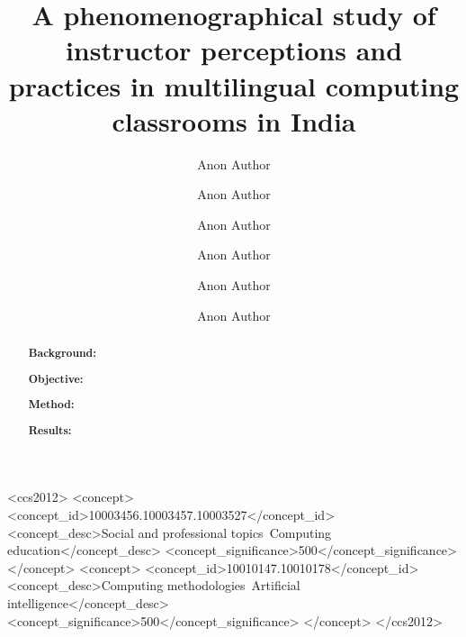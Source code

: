 \documentclass[sigconf]{acmart}
\begin{document}
\title[]{A phenomenographical study of instructor perceptions and practices in multilingual computing classrooms in India}



\author{Anon Author}
\orcid{}


\author{Anon Author}
\orcid{}


\author{Anon Author}
\orcid{}

\author{Anon Author}
\orcid{}

\author{Anon Author}
\orcid{}

\author{Anon Author}
\orcid{}



\renewcommand{\shortauthors}{}



\begin{abstract}

    \textbf{Background:} 

    \noindent\textbf{Objective:} 

    \noindent\textbf{Method:} 

    \noindent\textbf{Results:} 
\end{abstract}


\begin{CCSXML}
<ccs2012>
  <concept>
   <concept_id>10003456.10003457.10003527</concept_id>
   <concept_desc>Social and professional topics~Computing education</concept_desc>
   <concept_significance>500</concept_significance>
   </concept>
  <concept>
   <concept_id>10010147.10010178</concept_id>
   <concept_desc>Computing methodologies~Artificial intelligence</concept_desc>
   <concept_significance>500</concept_significance>
   </concept>
 </ccs2012>
\end{CCSXML}
\end{document}
